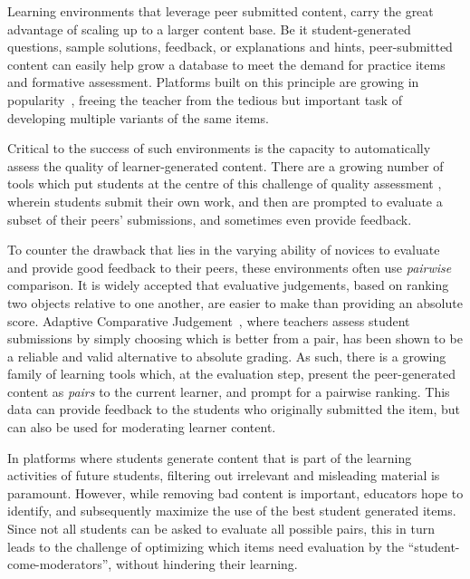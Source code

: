 \documentclass[runningheads]{llncs}
\begin{document}
Learning environments that leverage peer submitted content, carry the great 
advantage of scaling up to a larger content base.  
Be it student-generated questions, sample solutions, feedback, or explanations 
and hints, peer-submitted content can easily help grow a database to meet the 
demand for practice items and formative assessment.
Platforms built on this principle are growing in 
popularity~\cite{denny_effect_2013}\cite{khosravi_ripple_2019}, freeing the 
teacher from the tedious but important task of developing multiple variants of 
the same 
items. 

Critical to the success of such environments is the capacity to 
automatically assess the quality of learner-generated content.
There are a growing number of tools which put students at the centre of this 
challenge of quality assessment
\cite{potter_compair:_2017}\cite{cambre_juxtapeer:_2018},
wherein students submit their own work, and then are prompted to 
evaluate a subset of their peers' submissions, and sometimes even provide 
feedback.

To counter the drawback that lies in the varying ability of novices to evaluate 
and provide good feedback to their peers, these environments often use 
\textit{pairwise} comparison. 
It is widely accepted that evaluative judgements, based on ranking two objects 
relative to one another, are easier to make than providing an absolute score. 
Adaptive Comparative Judgement~\cite{pollitt_method_2012}, where teachers 
assess student submissions by simply choosing which is better from a pair, has 
been shown to be a reliable and valid alternative to absolute grading.
As such, there is a growing family of learning tools which, at the evaluation 
step, present the peer-generated content as \textit{pairs} to the current 
learner, and prompt for a pairwise ranking. 
This data can provide feedback to the students who originally submitted the 
item, but can also be used for moderating learner content.

In platforms where students generate content that is part of the learning 
activities of future students, filtering out irrelevant and misleading material 
is paramount. 
However, while removing bad content is important, educators hope to identify, 
and subsequently maximize the use of the best student generated items.
Since not all students can be asked to evaluate all possible pairs, this in 
turn leads to the challenge of optimizing which items need evaluation by the 
``student-come-moderators'', without hindering their learning.
 
\end{document}
